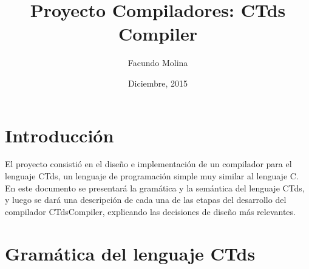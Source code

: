 \documentclass[11pt,a4paper]{article}
\author{Facundo Molina}
\begin{document}
\title{Proyecto Compiladores: CTds Compiler}
\date{Diciembre, 2015}
\maketitle

\section{Introducción}
\label{sec:intro}
El proyecto consistió en el diseño e implementación de un compilador para el lenguaje CTds, un lenguaje de programación simple muy similar al lenguaje C.  En este documento se presentará la gramática y la semántica del lenguaje CTds, y luego se dará una descripción de cada una de las etapas del desarrollo del compilador CTdsCompiler, explicando las decisiones de diseño más relevantes.

\section{Gramática del lenguaje CTds}
\label{sec:gramatica}
\end{document}
